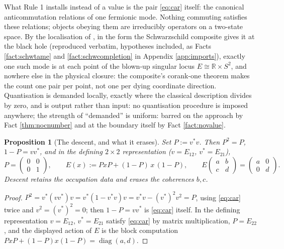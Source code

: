 \documentclass[11pt]{article}
\newtheorem{proposition}[theorem]{Proposition}
\theoremstyle{definition}
\newcommand{\R}{\mathbb{R}}
\begin{document}
What Rule 1 installs instead of a value is the pair \eqref{eq:car} itself: the canonical anticommutation relations of one fermionic mode. Nothing commuting satisfies these relations; objects obeying them are irreducibly operators on a two-state space. By the localisation of \cite[Cor.~4.5]{ButlerT4}, in the form the Schwarzschild composite gives it at the black hole \cite[Thm.~8.12]{ButlerT4} (reproduced verbatim, hypotheses included, as Facts \ref{fact:schwtame} and \ref{fact:schwcompletion} in Appendix \ref{app:imports}), exactly one such mode is at each point of the blown-up singular locus $E \cong \R \times S^2$, and nowhere else in the physical closure: the composite's corank-one theorem \cite[Thm.~8.7]{ButlerT4} makes the count one pair per point, not one per dying coordinate direction. Quantisation is demanded locally, exactly where the classical description divides by zero, and is output rather than input: no quantisation procedure is imposed anywhere; the strength of ``demanded'' is uniform: barred on the approach by Fact \ref{thm:nocnumber} and at the boundary itself by Fact \ref{fact:novalue}.

\begin{proposition}[The descent, and what it erases]\label{prop:descent}
Set $P := v^* v$. Then $P^2 = P$, $1 - P = v v^*$, and in the defining $2 \times 2$ representation ($v = E_{12}$, $v^* = E_{21}$),
\[
P = \begin{pmatrix} 0 & 0 \\ 0 & 1 \end{pmatrix}, \qquad
E(x) := P x P + (1{-}P)\,x\,(1{-}P), \qquad
E\begin{pmatrix} a & b \\ c & d \end{pmatrix} = \begin{pmatrix} a & 0 \\ 0 & d \end{pmatrix} .
\]
Descent retains the occupation data and erases the coherences $b, c$.
\end{proposition}

\begin{proof}
$P^2 = v^*(v v^*)v = v^*(1 - v^* v)v = v^* v - (v^*)^2 v^2 = P$, using \eqref{eq:car} twice and $v^2 = (v^*)^2 = 0$; then $1 - P = vv^*$ is \eqref{eq:car} itself. In the defining representation $v = E_{12}$, $v^*= E_{21}$ satisfy \eqref{eq:car} by matrix multiplication, $P = E_{22}$, and the displayed action of $E$ is the block computation $PxP + (1{-}P)x(1{-}P) = \operatorname{diag}(a, d)$.
\end{proof}
\end{document}
